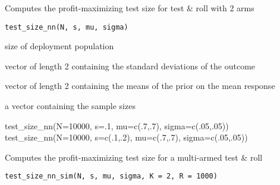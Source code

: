 \documentclass[a4paper]{book}
\begin{document}
%
\begin{Description}\relax
Computes the profit-maximizing test size for test \& roll with 2 arms
\end{Description}
%
\begin{Usage}
\begin{verbatim}
test_size_nn(N, s, mu, sigma)
\end{verbatim}
\end{Usage}
%
\begin{Arguments}
\begin{ldescription}
\item[\code{N}] size of deployment population

\item[\code{s}] vector of length 2 containing the standard deviations of the outcome

\item[\code{mu}] vector of length 2 containing the means of the prior on the mean response

\item[\code{sigma}] 
\end{ldescription}
\end{Arguments}
%
\begin{Value}
a vector containing the sample sizes
\end{Value}
%
\begin{Examples}
\begin{ExampleCode}
test_size_nn(N=10000, s=.1, mu=c(.7,.7), sigma=c(.05,.05))
test_size_nn(N=10000, s=c(.1,.2), mu=c(.7,.7), sigma=c(.05,.05))
\end{ExampleCode}
\end{Examples}
%
\begin{Description}\relax
Computes the profit-maximizing test size for a multi-armed test \& roll
\end{Description}
%
\begin{Usage}
\begin{verbatim}
test_size_nn_sim(N, s, mu, sigma, K = 2, R = 1000)
\end{verbatim}
\end{Usage}
%
\end{document}
